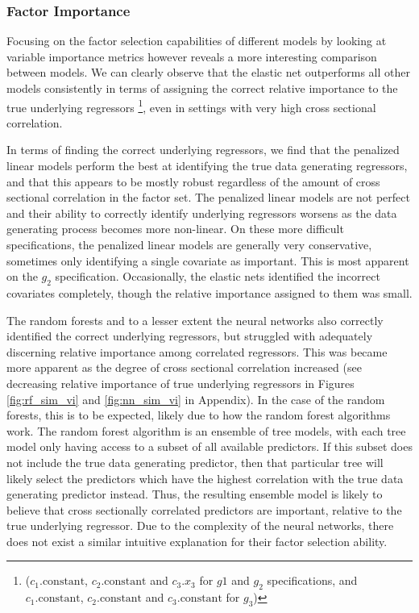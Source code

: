 \documentclass{article}
\begin{document}
\subsubsection{Factor Importance}

Focusing on the factor selection capabilities of different models by looking at variable importance metrics however reveals a more interesting comparison between models. We can clearly observe that the elastic net outperforms all other models consistently in terms of assigning the correct relative importance to the true underlying regressors \footnote{($c_1.\text{constant}$, $c_2.\text{constant}$ and $c_3.x_3$ for $g1$ and $g_2$ specifications, and $c_1.\text{constant}$, $c_2.\text{constant}$ and $c_3.\text{constant}$ for $g_3$)}, even in settings with very high cross sectional correlation. 

In terms of finding the correct underlying regressors, we find that the penalized linear models perform the best at identifying the true data generating regressors, and that this appears to be mostly robust regardless of the amount of cross sectional correlation in the factor set. The penalized linear models are not perfect and their ability to correctly identify underlying regressors worsens as the data generating process becomes more non-linear. On these more difficult specifications, the penalized linear models are generally very conservative, sometimes only identifying a single covariate as important. This is most apparent on the $g_2$ specification. Occasionally, the elastic nets identified the incorrect covariates completely, though the relative importance assigned to them was small. 

The random forests and to a lesser extent the neural networks also correctly identified the correct underlying regressors, but struggled with adequately discerning relative importance among correlated regressors. This was became more apparent as the degree of cross sectional correlation increased (see decreasing relative importance of true underlying regressors in Figures \ref{fig:rf_sim_vi} and \ref{fig:nn_sim_vi} in Appendix). In the case of the random forests, this is to be expected, likely due to how the random forest algorithms work. The random forest algorithm is an ensemble of tree models, with each tree model only having access to a subset of all available predictors. If this subset does not include the true data generating predictor, then that particular tree will likely select the predictors which have the highest correlation with the true data generating predictor instead. Thus, the resulting ensemble model is likely to believe that cross sectionally correlated predictors are important, relative to the true underlying regressor. Due to the complexity of the neural networks, there does not exist a similar intuitive explanation for their factor selection ability.
\end{document}
